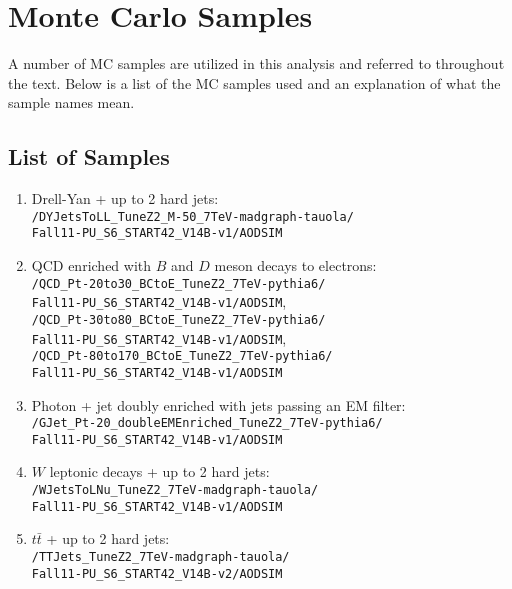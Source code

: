 \documentclass[dissertation.tex]{subfiles}
\begin{document}
\appendix
\chapter{Monte Carlo Samples}
\label{chap:Monte Carlo Samples}

\thispagestyle{myheadings} %
\markright{\hfill}

A number of MC samples are utilized in this analysis and referred to throughout the text.  Below is a list of the MC samples used and an explanation of what the sample names mean.

\section{List of Samples}
\label{sec:List of Samples}

\begin{enumerate}
\item Drell-Yan + up to 2 hard jets:\\\verb+/DYJetsToLL_TuneZ2_M-50_7TeV-madgraph-tauola/+\\\verb+Fall11-PU_S6_START42_V14B-v1/AODSIM+
\item QCD enriched with $B$ and $D$ meson decays to electrons:\\\verb+/QCD_Pt-20to30_BCtoE_TuneZ2_7TeV-pythia6/+\\\verb+Fall11-PU_S6_START42_V14B-v1/AODSIM+,\\\verb+/QCD_Pt-30to80_BCtoE_TuneZ2_7TeV-pythia6/+\\\verb+Fall11-PU_S6_START42_V14B-v1/AODSIM+,\\\verb+/QCD_Pt-80to170_BCtoE_TuneZ2_7TeV-pythia6/+\\\verb+Fall11-PU_S6_START42_V14B-v1/AODSIM+
\item Photon + jet doubly enriched with jets passing an EM filter:\\\verb+/GJet_Pt-20_doubleEMEnriched_TuneZ2_7TeV-pythia6/+\\\verb+Fall11-PU_S6_START42_V14B-v1/AODSIM+
\item $W$ leptonic decays + up to 2 hard jets:\\\verb+/WJetsToLNu_TuneZ2_7TeV-madgraph-tauola/+\\\verb+Fall11-PU_S6_START42_V14B-v1/AODSIM+
\item $t\bar{t}$ + up to 2 hard jets:\\\verb+/TTJets_TuneZ2_7TeV-madgraph-tauola/+\\\verb+Fall11-PU_S6_START42_V14B-v2/AODSIM+
\end{enumerate}
\end{document}
